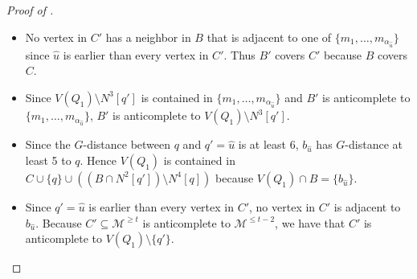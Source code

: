 \documentclass{article}
\begin{document}
\begin{proof}[Proof of ]
\begin{itemize}
    \item No vertex in $C'$ has a neighbor in $B$ that is adjacent to one of $\{m_1, \dots, m_{\alpha_{\hat{u}}}\}$ since $\hat{u}$ is earlier than every vertex in $C'$. Thus $B'$ covers $C'$ because $B$ covers $C$.
    \item Since $V(Q_1) \setminus N^3[q']$ is contained in $\{m_1, \dots, m_{\alpha_{\hat{u}}}\}$ and $B'$ is anticomplete to $\{ m_1, \dots, m_{\alpha_{\hat{u}}} \}$, $B'$ is anticomplete to $V(Q_1) \setminus N^3[q']$.
    \item Since the $G$-distance between $q$ and $q' = \hat{u}$ is at least 6, $b_{\hat{u}}$ has $G$-distance at least 5 to $q$. Hence $V(Q_1)$ is contained in $C \cup \{q\} \cup (( B \cap N^2[q'] ) \setminus N^4[q])$ because $V(Q_1) \cap B = \{b_{\hat{u}}\}$.
    \item Since $q' = \hat{u}$ is earlier than every vertex in $C'$, no vertex in $C'$ is adjacent to $b_{\hat{u}}$. Because $C' \subseteq \mathcal{M}^{\geq t}$ is anticomplete to $\mathcal{M}^{\leq t - 2}$, we have that $C'$ is anticomplete to $V(Q_1) \setminus \{q'\}$.
\end{itemize}
\end{proof}



\end{document}

